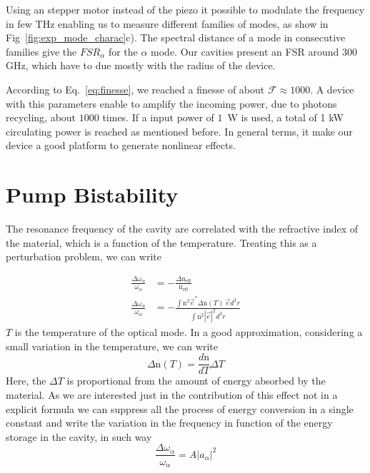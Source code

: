 Using an stepper motor instead of the piezo it possible to modulate the frequency in few THz enabling us to measure different families of modes, as show in Fig~\ref{fig:exp_mode_charac}c). The spectral distance of a mode in consecutive families give the $FSR_\alpha$ for the $\alpha$ mode. Our cavities present an FSR around $300$ GHz, which have to due mostly with the radius of the device. 

According to Eq.~\ref{eq:finesse}, we reached a finesse of about $\mathcal{F} \approx 1000$. A device with this parameters enable to amplify the incoming power, due to photons recycling, about $1000$ times. If a input power of $1$~W is used, a total of 1 kW circulating power is reached as mentioned before. In general terms, it make our device a good platform to generate nonlinear effects. 


\section{Pump Bistability}
\label{sec:bistability}

The resonance frequency of the cavity are correlated with the refractive index of the material, which is a function of the temperature. Treating this as a perturbation problem, we can write 

\begin{subequations}
    \begin{alignat}{2}
        \frac{\Delta\omega_\alpha}{\omega_\alpha} &= -\frac{\Delta \text{n}_\text{eff}}{\text{n}_\text{eff}}\\
        \frac{\Delta\omega_\alpha}{\omega_\alpha} &= -\frac{\int \text{n}^2\vec{e}^*\Delta\text{n}(T)~\vec{e} d^3r}
        {\int \text{n}^2 |\vec{e}|^2 d^3r}
        \label{eq:termooptc_change}
    \end{alignat}
\end{subequations}
$T$ is the temperature of the optical mode. In a good approximation, considering a small variation in the temperature, we can write
\begin{equation}
    \Delta \text{n}(T) = \frac{d\text{n}}{dT}\Delta T
\end{equation}
Here, the $\Delta T$ is proportional from the amount of energy absorbed by the material. As we are interested just in the contribution of this effect not in a explicit formula we can suppress all the process of energy conversion in a single constant and write the variation in the frequency in function of the energy storage in the cavity, in such way
\begin{equation}
\frac{\Delta \omega_\alpha}{\omega_\alpha} = A |a_\alpha|^2
\label{eq:pertubation_bistaliti_cavity}
\end{equation}   

